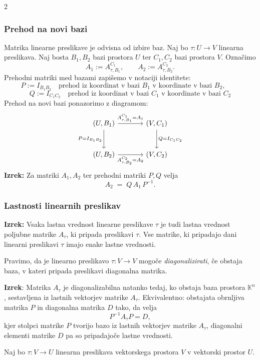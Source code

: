 \documentclass{article}
\begin{document}
\begin{multicols}{2}
	\subsubsection{Prehod na novi bazi}

	Matrika linearne preslikave je odvisna od izbire baz. Naj bo \(\tau:U\to V\) linearna preslikava.
	Naj bosta \(B_1,B_2\) bazi prostora \(U\) ter \(C_1,C_2\) bazi prostora \(V\).
	Označimo
	\[
		A_1 := A^{C_1}_{\tau,B_1},
		\qquad
		A_2 := A^{C_2}_{\tau,B_2}.
	\]
	Prehodni matriki med bazami zapišemo v notaciji identitete:
	\[
		P := I_{B_1B_2}
		\quad\text{prehod iz koordinat v bazi \(B_1\) v koordinate v bazi \(B_2\)},\qquad
	\]
	\[
		Q := I_{C_1C_2}
		\quad\text{prehod iz koordinat v bazi \(C_1\) v koordinate v bazi \(C_2\)}
	\]
	Prehod na novi bazi ponazorimo z diagramom:
	\[
		\begin{tikzcd}[column sep=large, row sep=large]
			(U,B_1) \arrow[r, "A^{C_1}_{\tau,B_1}=A_1"] \arrow[d, "P=I_{B_1B_2}"']
			& (V,C_1) \arrow[d, "Q=I_{C_1C_2}"] \\
			(U,B_2) \arrow[r, "A^{C_2}_{\tau,B_2}=A_2"']
			& (V,C_2)
		\end{tikzcd}
	\]
	\textbf{Izrek:}
	Za matriki \(A_1,A_2\) ter prehodni matriki \(P,Q\) velja
	\[
		A_2 \;=\; Q\,A_1\,P^{-1}.
	\]
	\subsubsection{Lastnosti linearnih preslikav}

	\textbf{Izrek:} Vsaka lastna vrednost linearne preslikave \( \tau \) je tudi lastna vrednost poljubne matrike \( A_{\tau} \), ki pripada preslikavi \( \tau \). Vse matrike, ki pripadajo dani linearni preslikavi \( \tau \) imajo enake lastne vrednosti.

	Pravimo, da je linearno preslikavo \( \tau: V \to V \) mogoče \textit{diagonalizirati}, če obstaja baza, v kateri pripada preslikavi diagonalna matrika.

	\textbf{Izrek}:
	Matrika \(A_{\tau}\) je diagonalizabilna natanko tedaj, ko obstaja baza prostora \(\mathbb{K}^n\), sestavljena iz lastnih vektorjev matrike \(A_{\tau}\).
	Ekvivalentno: obstajata obrnljiva matrika \(P\) in diagonalna matrika \(D\) tako, da velja
	\[
		P^{-1}A_{\tau}P = D,
	\]
	kjer stolpci matrike \(P\) tvorijo bazo iz lastnih vektorjev matrike \(A_{\tau}\), diagonalni elementi matrike \(D\) pa so pripadajoče lastne vrednosti.

	Naj bo \( \tau: V \rightarrow U \) linearna preslikava vektorskega prostora \( V \) v vektorski prostor \( U \).


\end{multicols}
\end{document}
